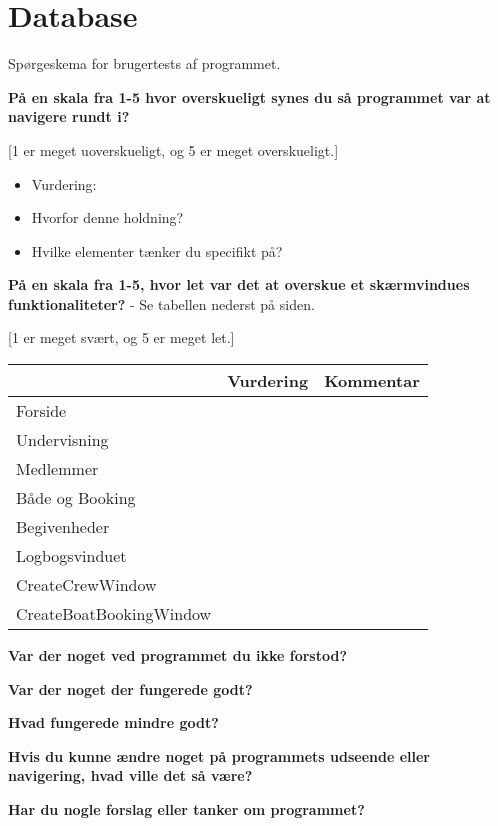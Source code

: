 \chapter{Database}\label{bilag:SporgeSkema}
Spørgeskema for brugertests af programmet.

\textbf{På en skala fra 1-5 hvor overskueligt synes du så programmet var at navigere rundt i?}

[1 er meget uoverskueligt, og 5 er meget overskueligt.]

\begin{itemize}
\item Vurdering: 
\item Hvorfor denne holdning? 
\item Hvilke elementer tænker du specifikt på?
\end{itemize}

\textbf{På en skala fra 1-5, hvor let var det at overskue et skærmvindues funktionaliteter?} - Se tabellen nederst på siden.

[1 er meget svært, og 5 er meget let.]

\begin{table}\label{TabelVurdering}
    \begin{tabular}{l|l|l}
    ~                       & Vurdering & Kommentar \\ \hline
    Forside                 & ~         & ~         \\
    Undervisning            & ~         & ~         \\
    Medlemmer               & ~         & ~         \\
    Både og Booking         & ~         & ~         \\
    Begivenheder            & ~         & ~         \\
    Logbogsvinduet          & ~         & ~         \\
    CreateCrewWindow        & ~         & ~         \\
    CreateBoatBookingWindow & ~         & ~         \\
    \end{tabular}
\end{table}

\textbf{Var der noget ved programmet du ikke forstod?}

\textbf{Var der noget der fungerede godt?}



\textbf{Hvad fungerede mindre godt?}

\textbf{Hvis du kunne ændre noget på programmets udseende eller navigering, hvad ville det så være?}

\textbf{Har du nogle forslag eller tanker om programmet?}
